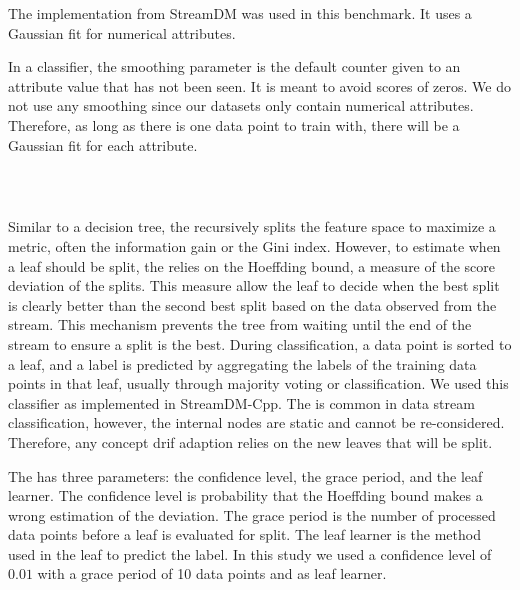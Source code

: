 The implementation from StreamDM was used in this
benchmark. It uses a Gaussian
fit for numerical attributes.

In a \naivebayes classifier, the smoothing parameter is the
default counter given to an attribute value that
has not been seen. It is meant to avoid scores of zeros.
We do not use any smoothing since our datasets
only contain numerical
attributes. Therefore, as long as there is one data
point to train with, there will be a Gaussian
fit for each attribute.

\subsubsection{\hoeffdingtree~\cite{VFDT}}
Similar to a decision tree, the \hoeffdingtree
recursively splits the feature space to maximize a metric, often the
information gain or the Gini
index. However,  to estimate when a leaf should be
split, the \hoeffdingtree relies on the
Hoeffding bound, a measure of the score deviation
of the splits. This measure allow the leaf to
decide when the best split is clearly better than
the second best split based on the data observed
from the stream. This mechanism prevents the tree
from waiting until the end of the stream
to ensure a split is the best.
During classification, a data point
is sorted to a leaf, and a label is predicted by
aggregating the labels of the training data points
in that leaf, usually through majority voting or
\naivebayes classification.  We used this
classifier as implemented in StreamDM-Cpp.  The
\hoeffdingtree is common in data stream
classification, however, the internal nodes are
static and cannot be re-considered. Therefore, any
concept drif adaption relies on the new leaves
that will be split.

The \hoeffdingtree has three parameters: the
confidence level, the grace period, and the leaf
learner. The confidence level is probability that
the Hoeffding bound makes a wrong estimation of
the deviation. The grace period is the number of
processed data points before a leaf is evaluated for split.
 The leaf learner is the method used in the
leaf to predict the label.  In this study we used
a confidence level of $0.01$ with a grace period
of 10 data points and \naivebayes as leaf
learner.

